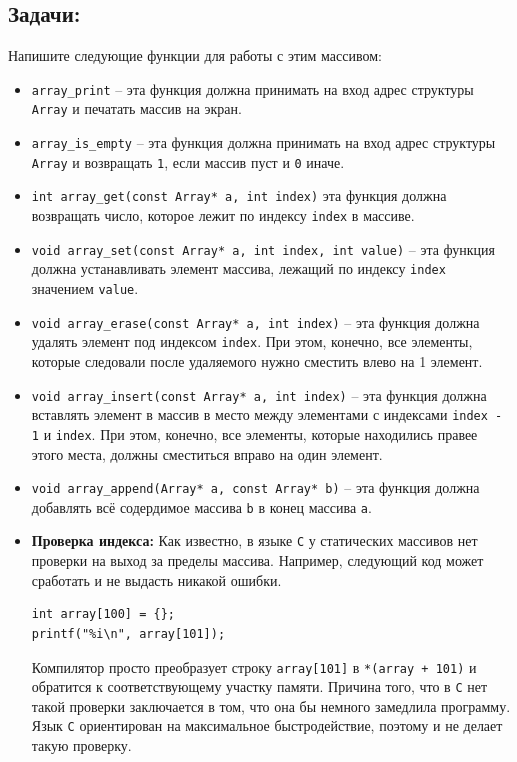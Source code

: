 \documentclass{article}
\begin{document}
\subsection*{Задачи:} 
Напишите следующие функции для работы с этим массивом:
\begin{itemize}
\item \texttt{array\_print} -- эта функция должна принимать на вход адрес структуры \texttt{Array} и печатать массив на экран.
\item \texttt{array\_is\_empty} -- эта функция должна принимать на вход адрес структуры \texttt{Array} и возвращать \texttt{1}, если массив пуст и \texttt{0} иначе.
\item \texttt{int array\_get(const Array* a, int index)} эта функция должна возвращать число, которое лежит по индексу \texttt{index} в массиве.
\item \texttt{void array\_set(const Array* a, int index, int value)} -- эта функция должна устанавливать элемент массива, лежащий по индексу \texttt{index} значением \texttt{value}.
\item \texttt{void array\_erase(const Array* a, int index)} -- эта функция должна удалять элемент под индексом \texttt{index}. При этом, конечно, все элементы, которые следовали после удаляемого нужно сместить влево на 1 элемент.
\item \texttt{void array\_insert(const Array* a, int index)} -- эта функция должна вставлять элемент в массив в место между элементами с индексами \texttt{index - 1} и \texttt{index}. При этом, конечно, все элементы, которые находились правее этого места, должны сместиться вправо на один элемент.
\item \texttt{void array\_append(Array* a, const Array* b)} -- эта функция должна добавлять всё содердимое массива \texttt{b} в конец массива \texttt{a}.

\item \textbf{Проверка индекса:} Как известно, в языке \texttt{C} у статических массивов нет проверки на выход за пределы массива. Например, следующий код может сработать и не выдасть никакой ошибки.
\begin{lstlisting}
int array[100] = {};
printf("%i\n", array[101]);
\end{lstlisting}
Компилятор просто преобразует строку \texttt{array[101]} в \texttt{*(array + 101)} и обратится к соответствующему участку памяти.
Причина того, что в \texttt{C} нет такой проверки заключается в том, что она бы немного замедлила программу. Язык \texttt{C} ориентирован на максимальное быстродействие, поэтому и не делает такую проверку. 


\end{itemize}
\end{document}
